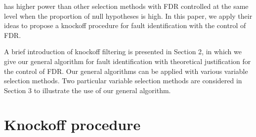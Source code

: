 \documentclass[]{interact}
\theoremstyle{plain}%
\theoremstyle{definition}
\theoremstyle{remark}
\begin{document}
has higher power than other selection methods with FDR controlled at the same level when the proportion of null hypotheses is high. In this paper, we apply their ideas to propose a knockoff procedure for fault identification with the control of FDR.

A brief introduction of knockoff filtering is presented in Section 2, in which we give our general algorithm for fault identification with theoretical justification for the control of FDR. Our general algorithms can be applied with various variable selection methods. Two particular variable selection methods are considered in Section 3 to illustrate the use of our general algorithm.


\section{Knockoff procedure}
\end{document}
